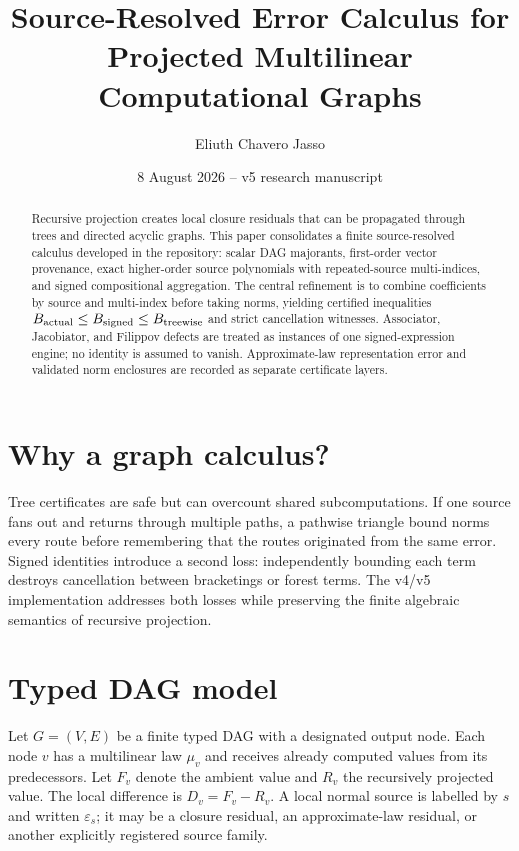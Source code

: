\documentclass[11pt]{amsart}
\title[Source-resolved error calculus]{Source-Resolved Error Calculus for Projected Multilinear Computational Graphs}
\author{Eliuth Chavero Jasso}
\date{8 August 2026 -- v5 research manuscript}
\theoremstyle{definition}
\theoremstyle{remark}
\begin{document}
\begin{abstract}
Recursive projection creates local closure residuals that can be propagated through trees and directed acyclic graphs. This paper consolidates a finite source-resolved calculus developed in the repository: scalar DAG majorants, first-order vector provenance, exact higher-order source polynomials with repeated-source multi-indices, and signed compositional aggregation. The central refinement is to combine coefficients by source and multi-index before taking norms, yielding certified inequalities $B_{\rm actual}\le B_{\rm signed}\le B_{\rm treewise}$ and strict cancellation witnesses. Associator, Jacobiator, and Filippov defects are treated as instances of one signed-expression engine; no identity is assumed to vanish. Approximate-law representation error and validated norm enclosures are recorded as separate certificate layers.\end{abstract}
\maketitle

\section{Why a graph calculus?}

Tree certificates are safe but can overcount shared subcomputations. If one
source fans out and returns through multiple paths, a pathwise triangle bound
norms every route before remembering that the routes originated from the same
error. Signed identities introduce a second loss: independently bounding each
term destroys cancellation between bracketings or forest terms. The v4/v5
implementation addresses both losses while preserving the finite algebraic
semantics of recursive projection.

\section{Typed DAG model}

Let $G=(V,E)$ be a finite typed DAG with a designated output node. Each node
$v$ has a multilinear law $\mu_v$ and receives already computed values from
its predecessors. Let $F_v$ denote the ambient value and $R_v$ the recursively
projected value. The local difference is $D_v=F_v-R_v$. A local normal source
is labelled by $s$ and written $\varepsilon_s$; it may be a closure residual,
an approximate-law residual, or another explicitly registered source family.
\end{document}
